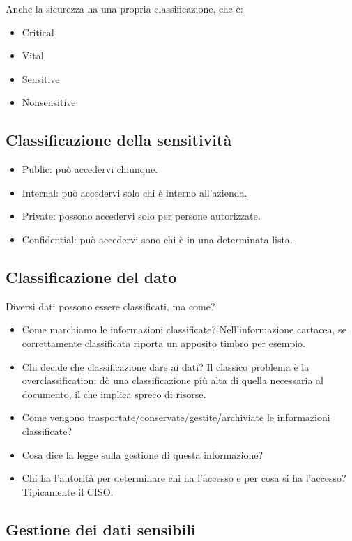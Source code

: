 Anche la sicurezza ha una propria classificazione, che è:
\begin{itemize}
  \item Critical
  \item Vital
  \item Sensitive
  \item Nonsensitive
\end{itemize}

\subsection{Classificazione della sensitività}

\begin{itemize}
\item Public: può accedervi chiunque.
\item Internal: può accedervi solo chi è interno all'azienda.
\item Private: possono accedervi solo per persone autorizzate.
\item Confidential: può accedervi sono chi è in una determinata lista.
\end{itemize}

\subsection{Classificazione del dato}

Diversi dati possono essere classificati, ma come?

\begin{itemize}
\item Come marchiamo le informazioni classificate? Nell'informazione cartacea, 
se correttamente classificata riporta un apposito timbro per esempio.
\item Chi decide che classificazione dare ai dati? Il classico problema è la
overclassification: dò una classificazione più alta di quella necessaria al
documento, il che implica spreco di risorse.
\item Come vengono trasportate/conservate/gestite/archiviate le informazioni classificate?
\item Cosa dice la legge sulla gestione di questa informazione?
\item Chi ha l'autorità per determinare chi ha l'accesso e per cosa si ha
l'accesso? Tipicamente il CISO.
\end{itemize}

\subsection{Gestione dei dati sensibili}


